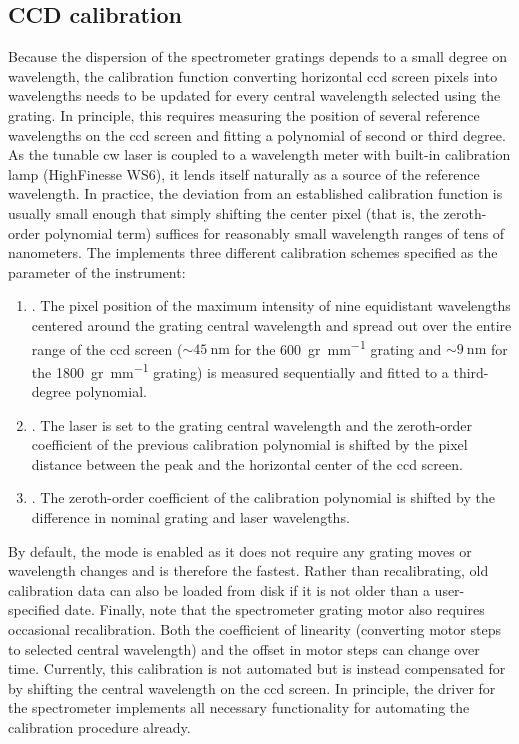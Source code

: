 \subsection{CCD calibration}\label{subsec:sec:exp:mjolnir:calibration:ccd}
Because the dispersion of the spectrometer gratings depends to a small degree on wavelength, the calibration function converting horizontal \gls{ccd} screen pixels into wavelengths needs to be updated for every central wavelength selected using the grating.
In principle, this requires measuring the position of several reference wavelengths on the \gls{ccd} screen and fitting a polynomial of second or third degree.
As the tunable \gls{cw} laser is coupled to a wavelength meter with built-in calibration lamp (HighFinesse WS6), it lends itself naturally as a source of the reference wavelength.
In practice, the deviation from an established calibration function is usually small enough that simply shifting the center pixel (that is, the zeroth-order polynomial term) suffices for reasonably small wavelength ranges of tens of nanometers.
The  implements three different calibration schemes specified as the  parameter of the  instrument:
\begin{enumerate}
    \item {}.
        The pixel position of the maximum intensity of nine equidistant wavelengths centered around the grating central wavelength and spread out over the entire range of the \gls{ccd} screen ($\sim\qty{45}{\nano\meter}$ for the \qty{600}{gr\per\milli\meter} grating and $\sim\qty{9}{\nano\meter}$ for the \qty{1800}{gr\per\milli\meter} grating) is measured sequentially and fitted to a third-degree polynomial.
    \item {}.
        The laser is set to the grating central wavelength and the zeroth-order coefficient of the previous calibration polynomial is shifted by the pixel distance between the peak and the horizontal center of the \gls{ccd} screen.
    \item {}.
        The zeroth-order coefficient of the calibration polynomial is shifted by the difference in nominal grating and laser wavelengths.
\end{enumerate}
By default, the  mode is enabled as it does not require any grating moves or wavelength changes and is therefore the fastest.
Rather than recalibrating, old calibration data can also be loaded from disk if it is not older than a user-specified date.
Finally, note that the spectrometer grating motor also requires occasional recalibration.
Both the coefficient of linearity (converting motor steps to selected central wavelength) and the offset in motor steps can change over time.
Currently, this calibration is not automated but is instead compensated for by shifting the central wavelength on the \gls{ccd} screen.
In principle, the driver for the \thespectrometer spectrometer implements all necessary functionality for automating the calibration procedure already.

